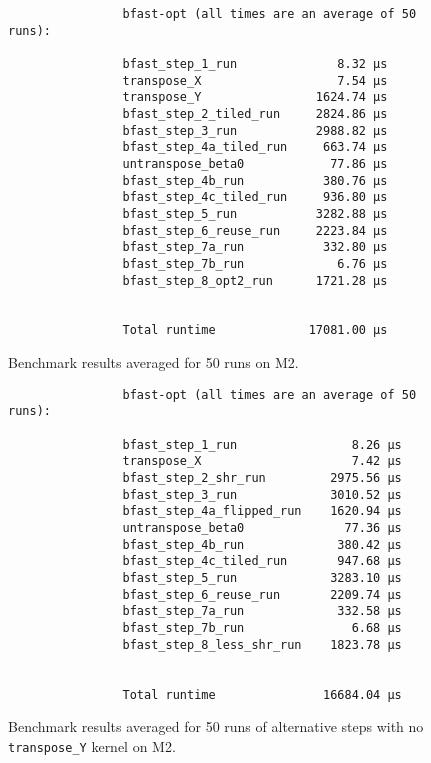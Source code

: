 \begin{figure}[H]
\centering

                \begin{verbatim}
                bfast-opt (all times are an average of 50 runs):

                bfast_step_1_run              8.32 µs
                transpose_X                   7.54 µs
                transpose_Y                1624.74 µs
                bfast_step_2_tiled_run     2824.86 µs
                bfast_step_3_run           2988.82 µs
                bfast_step_4a_tiled_run     663.74 µs
                untranspose_beta0            77.86 µs
                bfast_step_4b_run           380.76 µs
                bfast_step_4c_tiled_run     936.80 µs
                bfast_step_5_run           3282.88 µs
                bfast_step_6_reuse_run     2223.84 µs
                bfast_step_7a_run           332.80 µs
                bfast_step_7b_run             6.76 µs
                bfast_step_8_opt2_run      1721.28 µs


                Total runtime             17081.00 µs
                \end{verbatim}
\caption{Benchmark results averaged for 50 runs on M2.}
\label{tbl:resultsM2}
\end{figure}



\begin{figure}[H]
\centering
                \begin{verbatim}
                bfast-opt (all times are an average of 50 runs):

                bfast_step_1_run                8.26 µs
                transpose_X                     7.42 µs
                bfast_step_2_shr_run         2975.56 µs
                bfast_step_3_run             3010.52 µs
                bfast_step_4a_flipped_run    1620.94 µs
                untranspose_beta0              77.36 µs
                bfast_step_4b_run             380.42 µs
                bfast_step_4c_tiled_run       947.68 µs
                bfast_step_5_run             3283.10 µs
                bfast_step_6_reuse_run       2209.74 µs
                bfast_step_7a_run             332.58 µs
                bfast_step_7b_run               6.68 µs
                bfast_step_8_less_shr_run    1823.78 µs


                Total runtime               16684.04 µs
                \end{verbatim}
\caption{Benchmark results averaged for 50 runs of alternative steps with no
\texttt{transpose\_Y} kernel on M2.}
\label{tbl:resultsM2alt}
\end{figure}


